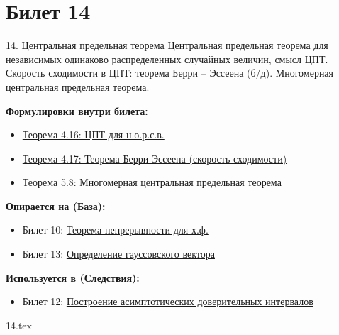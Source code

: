 \documentclass[a4paper, 12pt]{article}
\newcommand{\ticketsection}[1]{\vspace{0.5em}\noindent\textbf{\textcolor{ticketdark}{\sffamily #1}}\par}
\begin{document}
\section{Билет 14}
\begin{ticketskeleton}{14. Центральная предельная теорема}
     Центральная предельная теорема для независимых одинаково распределенных случайных величин, смысл ЦПТ. Скорость сходимости в ЦПТ: теорема Берри -- Эссеена (б/д). Многомерная центральная предельная теорема.

    \ticketsection{Формулировки внутри билета:}
    \begin{itemize}
        \item \hyperref[thm:clt]{Теорема 4.16: ЦПТ для н.о.р.с.в.}
        \item \hyperref[thm:berry_esseen]{Теорема 4.17: Теорема Берри-Эссеена (скорость сходимости)}
        \item \hyperref[thm:multi_clt]{Теорема 5.8: Многомерная центральная предельная теорема}
    \end{itemize}

    \ticketsection{Опирается на (База):}
    \begin{itemize}
        \item Билет 10: \hyperref[thm:continuity]{Теорема непрерывности для х.ф.}
        \item Билет 13: \hyperref[thm:three_def]{Определение гауссовского вектора}
    \end{itemize}

    \ticketsection{Используется в (Следствия):}
    \begin{itemize}
        \item Билет 12: \hyperref[ex:ci_bernoulli]{Построение асимптотических доверительных интервалов}
    \end{itemize}
\end{ticketskeleton}

{14.tex}
\end{document}
